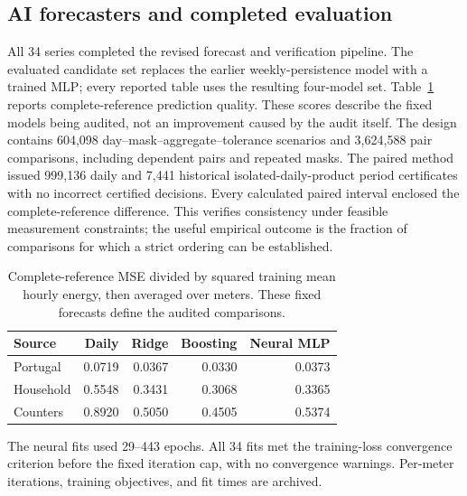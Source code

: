 \documentclass[12pt]{article}
\begin{document}
\subsection{AI forecasters and completed evaluation}
All 34 series completed the revised forecast and verification pipeline.
The evaluated candidate set replaces the earlier weekly-persistence model with a
trained MLP; every reported table uses the resulting four-model set.
Table~\ref{tab:forecasts} reports complete-reference prediction quality.
These scores describe the fixed models being audited, not an improvement
caused by the audit itself. The design contains 604,098
day--mask--aggregate--tolerance scenarios and 3,624,588
pair comparisons, including dependent pairs and repeated masks.
The paired method issued 999,136 daily and
7,441 historical isolated-daily-product period certificates with no incorrect
certified decisions. Every calculated paired interval enclosed the
complete-reference difference. This verifies consistency under feasible
measurement constraints; the useful empirical outcome is the fraction of
comparisons for which a strict ordering can be established.
\begin{table}[htbp]
\centering\normalsize\setlength{\tabcolsep}{4pt}
\caption{Complete-reference MSE divided by squared training mean hourly energy, then averaged over meters. These fixed forecasts define the audited comparisons.}
\label{tab:forecasts}
\begin{tabular}{lrrrr}
\toprule
Source & Daily & Ridge & Boosting & Neural MLP\\
\midrule
Portugal & 0.0719 & 0.0367 & 0.0330 & 0.0373\\
Household & 0.5548 & 0.3431 & 0.3068 & 0.3365\\
Counters & 0.8920 & 0.5050 & 0.4505 & 0.5374\\
\bottomrule
\end{tabular}
\end{table}
The neural fits used 29--443 epochs.
All 34 fits met the training-loss convergence criterion
before the fixed iteration cap, with no convergence warnings. Per-meter
iterations, training objectives, and fit times are archived.
\end{document}

